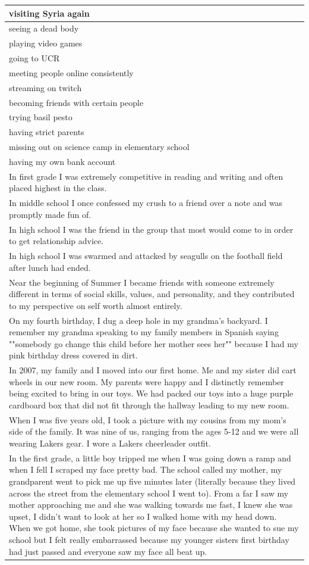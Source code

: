 \documentclass[
  .7em,
  letterpaper,
  DIV=11,
  numbers=noendperiod]{scrartcl}
\begin{document}
\begin{table}
\begin{tabular}{l}
\hline
visiting Syria again\\
\hline
seeing a dead body\\
\hline
playing video games\\
\hline
going to UCR\\
\hline
meeting people online consistently\\
\hline
streaming on twitch\\
\hline
becoming friends with certain people\\
\hline
trying basil pesto\\
\hline
having strict parents\\
\hline
missing out on science camp in elementary school\\
\hline
having my own bank account\\
\hline
In first grade I was extremely competitive in reading and writing and often placed highest in the class.\\
\hline
In middle school I once confessed my crush to a friend over a note and was promptly made fun of.\\
\hline
In high school I was the friend in the group that most would come to in order to get relationship advice.\\
\hline
In high school I was swarmed and attacked by seagulls on the football field after lunch had ended.\\
\hline
Near the beginning of Summer I became friends with someone extremely different in terms of social skills, values, and personality, and they contributed to my perspective on self worth almost entirely.\\
\hline
On my fourth birthday, I dug a deep hole in my grandma's backyard. I remember my grandma speaking to my family members in Spanish saying ""somebody go change this child before her mother sees her"" because I had my pink birthday dress covered in dirt.\\
\hline
In 2007, my family and I moved into our first home. Me and my sister did cart wheels in our new room. My parents were happy and I distinctly remember being excited to bring in our toys. We had packed our toys into a huge purple cardboard box that did not fit through the hallway leading to my new room.\\
\hline
When I was five years old, I took a picture with my cousins from my mom's side of the family. It was nine of us, ranging from the ages 5-12 and we were all wearing Lakers gear. I wore a Lakers cheerleader outfit.\\
\hline
In the first grade, a little boy tripped me when I was going down a ramp and when I fell I scraped my face pretty bad. The school called my mother, my grandparent went to pick me up five minutes later (literally because they lived across the street from the elementary school I went to). From a far I saw my mother approaching me and she was walking towards me fast, I knew she was upset, I didn't want to look at her so I walked home with my head down. When we got home, she took pictures of my face because she wanted to sue my school but I felt really embarrassed because my younger sisters first birthday had just passed and everyone saw my face all beat up.\\

\end{tabular}
\end{table}
\end{document}
